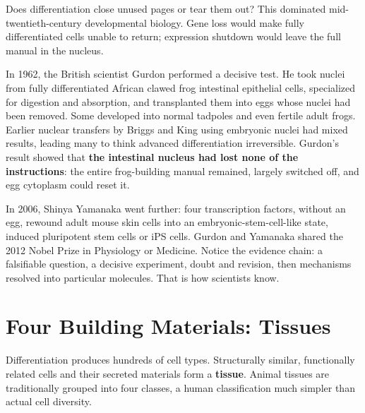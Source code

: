 \begin{zhengju}
Does differentiation close unused pages or tear them out? This dominated mid-twentieth-century developmental biology. Gene loss would make fully differentiated cells unable to return; expression shutdown would leave the full manual in the nucleus.

In 1962, the British scientist Gurdon performed a decisive test. He took nuclei from fully differentiated African clawed frog intestinal epithelial cells, specialized for digestion and absorption, and transplanted them into eggs whose nuclei had been removed. Some developed into normal tadpoles and even fertile adult frogs. Earlier nuclear transfers by Briggs and King using embryonic nuclei had mixed results, leading many to think advanced differentiation irreversible. Gurdon's result showed that \textbf{the intestinal nucleus had lost none of the instructions}: the entire frog-building manual remained, largely switched off, and egg cytoplasm could reset it.

In 2006, Shinya Yamanaka went further: four transcription factors, without an egg, rewound adult mouse skin cells into an embryonic-stem-cell-like state, induced pluripotent stem cells or iPS cells. Gurdon and Yamanaka shared the 2012 Nobel Prize in Physiology or Medicine. Notice the evidence chain: a falsifiable question, a decisive experiment, doubt and revision, then mechanisms resolved into particular molecules. That is how scientists know.
\end{zhengju}

\section{Four Building Materials: Tissues}

Differentiation produces hundreds of cell types. Structurally similar, functionally related cells and their secreted materials form a \textbf{tissue}. Animal tissues are traditionally grouped into four classes, a human classification much simpler than actual cell diversity.

